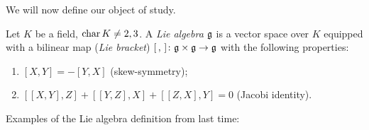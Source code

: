 We will now define our object of study.

\begin{definition}
Let $K$ be a field, $\operatorname{char} K \neq 2, 3$. A \emph{Lie algebra} $\mathfrak{g}$ is a
vector space over $K$ equipped with a bilinear map (\emph{Lie bracket})
$[\,,\,]\colon \mathfrak{g} \times \mathfrak{g} \to \mathfrak{g}$ with the following properties:
\begin{enumerate}
  \item $[X, Y] = -[Y, X]$ (skew-symmetry);
  \item $[[X, Y], Z] + [[Y, Z], X] + [[Z, X], Y] = 0$ (Jacobi identity).
\end{enumerate}
\end{definition}

 Examples of the Lie algebra definition from last time:

